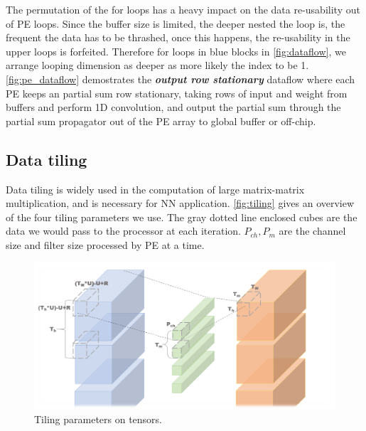 The permutation of the for loops has a heavy impact on the data re-usability out of PE loops. Since the buffer size is limited, the deeper nested the loop is, the frequent the data has to be thrashed, once this happens, the re-usability in the upper loops is forfeited. Therefore for loops in blue blocks in \autoref{fig:dataflow}, we arrange looping dimension as deeper as more likely the index to be 1. \\
\autoref{fig:pe_dataflow} demostrates the \textbf{\textit{output row stationary}} dataflow where each PE keeps an partial sum row stationary, taking rows of input and weight from buffers and perform 1D convolution, and output the partial sum through the partial sum propagator out of the PE array to global buffer or off-chip. 
\subsection{Data tiling}
Data tiling is widely used in the computation of large matrix-matrix multiplication, and is necessary for NN application. \autoref{fig:tiling} gives an overview of the four tiling parameters we use. The gray dotted line enclosed cubes are the data we would pass to the processor at each iteration. $P_{ch},P_m$ are the channel size and filter size processed by PE at a time. \\
\begin{figure}[h]
    \centering
    \includegraphics[width=1\linewidth]{inc/4_proposed_architecture/figure/tiling.png}
    \caption{Tiling parameters on tensors.}
    \label{fig:tiling}
\end{figure}


